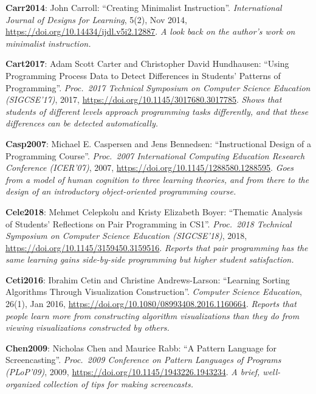 \textbf{\hypertarget{b:Carr2014}{Carr2014}\label{b:Carr2014}}: John Carroll: ``Creating Minimalist Instruction''. \emph{International Journal of Designs for Learning}, 5(2), Nov 2014, \url{https://doi.org/10.14434/ijdl.v5i2.12887}. \emph{A look back on the author's work on minimalist instruction.}

\textbf{\hypertarget{b:Cart2017}{Cart2017}\label{b:Cart2017}}: Adam Scott Carter and Christopher David Hundhausen: ``Using Programming Process Data to Detect Differences in Students' Patterns of Programming''. \emph{Proc.\ 2017 Technical Symposium on Computer Science Education (SIGCSE'17)}, 2017, \url{https://doi.org/10.1145/3017680.3017785}. \emph{Shows that students of different levels approach programming tasks differently, and that these differences can be detected automatically.}

\textbf{\hypertarget{b:Casp2007}{Casp2007}\label{b:Casp2007}}: Michael E. Caspersen and Jens Bennedsen: ``Instructional Design of a Programming Course''. \emph{Proc.\ 2007 International Computing Education Research Conference (ICER'07)}, 2007, \url{https://doi.org/10.1145/1288580.1288595}. \emph{Goes from a model of human cognition to three learning theories, and from there to the design of an introductory object-oriented programming course.}

\textbf{\hypertarget{b:Cele2018}{Cele2018}\label{b:Cele2018}}: Mehmet Celepkolu and Kristy Elizabeth Boyer: ``Thematic Analysis of Students' Reflections on Pair Programming in CS1''. \emph{Proc.\ 2018 Technical Symposium on Computer Science Education (SIGCSE'18)}, 2018, \url{https://doi.org/10.1145/3159450.3159516}. \emph{Reports that pair programming has the same learning gains side-by-side programming but higher student satisfaction.}

\textbf{\hypertarget{b:Ceti2016}{Ceti2016}\label{b:Ceti2016}}: Ibrahim Cetin and Christine Andrews-Larson: ``Learning Sorting Algorithms Through Visualization Construction''. \emph{Computer Science Education}, 26(1), Jan 2016, \url{https://doi.org/10.1080/08993408.2016.1160664}. \emph{Reports that people learn more from constructing algorithm visualizations than they do from viewing visualizations constructed by others.}

\textbf{\hypertarget{b:Chen2009}{Chen2009}\label{b:Chen2009}}: Nicholas Chen and Maurice Rabb: ``A Pattern Language for Screencasting''. \emph{Proc.\ 2009 Conference on Pattern Languages of Programs (PLoP'09)}, 2009, \url{https://doi.org/10.1145/1943226.1943234}. \emph{A brief, well-organized collection of tips for making screencasts.}


